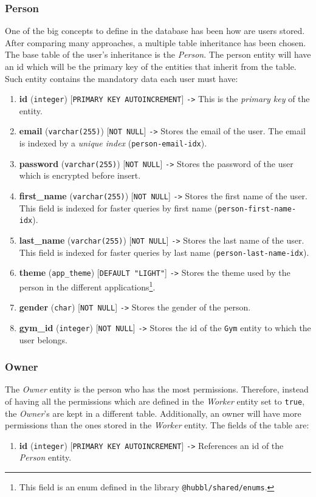 \documentclass[a4paper, 12pt, oneside]{book}
\begin{document}
\subsubsection{Person}
One of the big concepts to define in the database has been how are users stored. After comparing many approaches, a multiple table inheritance has been chosen. The base table of the user's inheritance is the \emph{Person}. The person entity will have an id which will be the primary key of the entities that inherit from the table. Such entity contains the mandatory data each user must have:
\begin{enumerate}[label = -]
	\item \textbf{id} (\texttt{integer}) [\texttt{PRIMARY KEY AUTOINCREMENT}] \texttt{->} This is the \emph{primary key} of the entity.
	\item \textbf{email} (\texttt{varchar(255)}) [\texttt{NOT NULL}] \texttt{->} Stores the email of the user. The email is indexed by a \emph{unique index} (\texttt{person-email-idx}).
	\item \textbf{password} (\texttt{varchar(255)}) [\texttt{NOT NULL}] \texttt{->} Stores the password of the user which is encrypted before insert.
	\item \textbf{first\_name} (\texttt{varchar(255)}) [\texttt{NOT NULL}] \texttt{->} Stores the first name of the user. This field is indexed for faster queries by first name (\texttt{person-first-name-idx}).
	\item \textbf{last\_name} (\texttt{varchar(255)}) [\texttt{NOT NULL}] \texttt{->} Stores the last name of the user. This field is indexed for faster queries by last name (\texttt{person-last-name-idx}).
	\item \textbf{theme} (\texttt{app\_theme}) [\texttt{DEFAULT "LIGHT"}] \texttt{->} Stores the theme used by the person in the different applications\footnote{This field is an enum defined in the library \texttt{@hubbl/shared/enums}.}.
	\item \textbf{gender} (\texttt{char}) [\texttt{NOT NULL}] \texttt{->} Stores the gender of the person.
	\item \textbf{gym\_id} (\texttt{integer}) [\texttt{NOT NULL}] \texttt{->} Stores the id of the \texttt{Gym} entity to which the user belongs.
\end{enumerate}
\subsubsection{Owner}
The \emph{Owner} entity is the person who has the most permissions. Therefore, instead of having all the permissions which are defined in the \emph{Worker} entity set to \texttt{true}, the \emph{Owner}'s are kept in a different table. Additionally, an owner will have more permissions than the ones stored in the \emph{Worker} entity. The fields of the table are:
\begin{enumerate}[label = -]
	\item \textbf{id} (\texttt{integer}) [\texttt{PRIMARY KEY AUTOINCREMENT}] \texttt{->} References an id of the \emph{Person} entity.
\end{enumerate}
\end{document}
